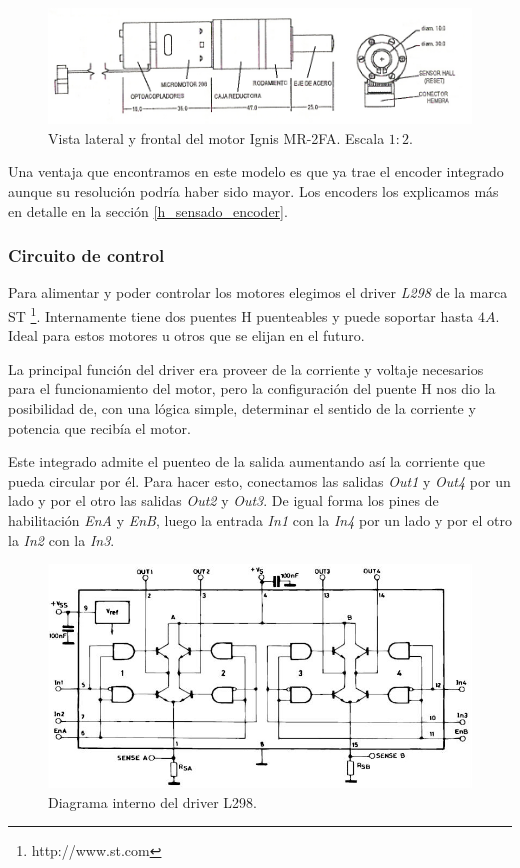 \begin{figure}[ht]
	\centering
	\includegraphics[scale=1]{MR2-FA.png}
	\caption{Vista lateral y frontal del motor Ignis MR-2FA. Escala $1:2$.}
	\label{hF_motorDC}
\end{figure}

Una ventaja que encontramos en este modelo es que ya trae el encoder integrado aunque su resoluci\'on podr\'ia haber sido mayor.
Los encoders los explicamos m\'as en detalle en la secci\'on \ref{h_sensado_encoder}.

\subsubsection{Circuito de control}
\label{h_actuadores_motorDC_circuito}

Para alimentar y poder controlar los motores elegimos el driver \emph{L298} de la marca ST \footnote{http://www.st.com}.
Internamente tiene dos puentes H puenteables y puede soportar hasta $4 A$. Ideal para estos motores u otros que se elijan en el futuro.

La principal funci\'on del driver era proveer de la corriente y voltaje necesarios para el funcionamiento del motor, pero la configuraci\'on
del puente H nos dio la posibilidad de, con una l\'ogica simple, determinar el sentido de la corriente y potencia que recib\'ia el motor.

Este integrado admite el puenteo de la salida aumentando as\'i la corriente que pueda circular por \'el.
Para hacer esto, conectamos las salidas \emph{Out1} y \emph{Out4} por un lado y por el otro las salidas \emph{Out2} y \emph{Out3}.
De igual forma los pines de habilitaci\'on \emph{EnA} y \emph{EnB}, luego la entrada \emph{In1} con la \emph{In4} por un lado y
por el otro la \emph{In2} con la \emph{In3}.

\begin{figure}[ht]
	\centering
	\includegraphics[scale=0.40]{L298.png}
	\caption{Diagrama interno del driver L298.}
	\label{hF_l298}
\end{figure}

